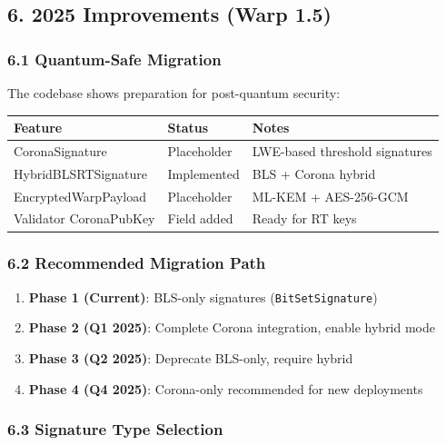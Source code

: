 \documentclass[
]{article}
\newcounter{none} %
\providecommand{\tightlist}{%
  \setlength{\itemsep}{0pt}\setlength{\parskip}{0pt}}
\begin{document}
\subsection{6. 2025 Improvements (Warp
1.5)}\label{6-2025-improvements-warp-15}

\subsubsection{6.1 Quantum-Safe
Migration}\label{61-quantum-safe-migration}

The codebase shows preparation for post-quantum security:

{\def\LTcaptype{none} %
\begin{longtable}[]{@{}lll@{}}
\toprule\noalign{}
Feature & Status & Notes \\
\midrule\noalign{}
\endhead
\bottomrule\noalign{}
\endlastfoot
CoronaSignature & Placeholder & LWE-based threshold signatures \\
HybridBLSRTSignature & Implemented & BLS + Corona hybrid \\
EncryptedWarpPayload & Placeholder & ML-KEM + AES-256-GCM \\
Validator CoronaPubKey & Field added & Ready for RT keys \\
\end{longtable}
}

\subsubsection{6.2 Recommended Migration
Path}\label{62-recommended-migration-path}

\begin{enumerate}
\def\labelenumi{\arabic{enumi}.}
\tightlist
\item
  \textbf{Phase 1 (Current)}: BLS-only signatures
  (\texttt{BitSetSignature})
\item
  \textbf{Phase 2 (Q1 2025)}: Complete Corona integration, enable
  hybrid mode
\item
  \textbf{Phase 3 (Q2 2025)}: Deprecate BLS-only, require hybrid
\item
  \textbf{Phase 4 (Q4 2025)}: Corona-only recommended for new
  deployments
\end{enumerate}

\subsubsection{6.3 Signature Type
Selection}\label{63-signature-type-selection}
\end{document}
